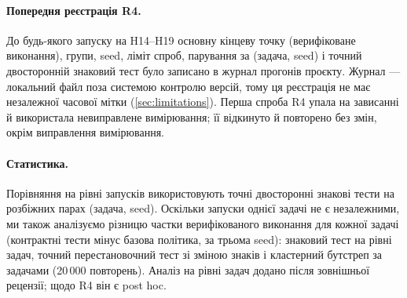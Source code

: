 \documentclass[11pt]{article}
\begin{document}
\paragraph{Попередня реєстрація R4.} До будь-якого запуску на H14--H19 основну кінцеву точку (верифіковане виконання), групи, seed, ліміт спроб, парування за (задача, seed) і точний двосторонній знаковий тест було записано в журнал прогонів проєкту. Журнал --- локальний файл поза системою контролю версій, тому ця реєстрація не має незалежної часової мітки (\cref{sec:limitations}). Перша спроба R4 упала на зависанні й використала невиправлене вимірювання; її відкинуто й повторено без змін, окрім виправлення вимірювання.

\paragraph{Статистика.} Порівняння на рівні запусків використовують точні двосторонні знакові тести на розбіжних парах (задача, seed). Оскільки запуски однієї задачі не є незалежними, ми також аналізуємо різницю частки верифікованого виконання для кожної задачі (контрактні тести мінус базова політика, за трьома seed): знаковий тест на рівні задач, точний перестановочний тест зі зміною знаків і кластерний бутстреп за задачами (20\,000 повторень). Аналіз на рівні задач додано після зовнішньої рецензії; щодо R4 він є post hoc.
\end{document}
